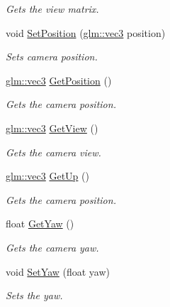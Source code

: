 \begin{CompactItemize}
\begin{CompactList}\small\item\em Gets the view matrix. \item\end{CompactList}\item 
void \hyperlink{class_camera_513c43647fdc22a1f1f2ce75d67e6c43}{SetPosition} (\hyperlink{group__core__types_g1c47e8b3386109bc992b6c48e91b0be7}{glm::vec3} position)
\begin{CompactList}\small\item\em Sets camera position. \item\end{CompactList}\item 
\hyperlink{group__core__types_g1c47e8b3386109bc992b6c48e91b0be7}{glm::vec3} \hyperlink{class_camera_7166b8466c94d0b5c127fc74c7881beb}{GetPosition} ()
\begin{CompactList}\small\item\em Gets the camera position. \item\end{CompactList}\item 
\hyperlink{group__core__types_g1c47e8b3386109bc992b6c48e91b0be7}{glm::vec3} \hyperlink{class_camera_338c5baf20b57652828c53e0791adf9a}{GetView} ()
\begin{CompactList}\small\item\em Gets the camera view. \item\end{CompactList}\item 
\hyperlink{group__core__types_g1c47e8b3386109bc992b6c48e91b0be7}{glm::vec3} \hyperlink{class_camera_ff61f06284cca3216accdf556dfbd3c1}{GetUp} ()
\begin{CompactList}\small\item\em Gets the camera position. \item\end{CompactList}\item 
float \hyperlink{class_camera_6318f73a8c7364eb477b7b5aa0ee930e}{GetYaw} ()
\begin{CompactList}\small\item\em Gets the camera yaw. \item\end{CompactList}\item 
void \hyperlink{class_camera_0f3853ee0b4a1c1fcf3c136decbbe056}{SetYaw} (float yaw)
\begin{CompactList}\small\item\em Sets the yaw. \item\end{CompactList}\item 

\end{CompactItemize}
